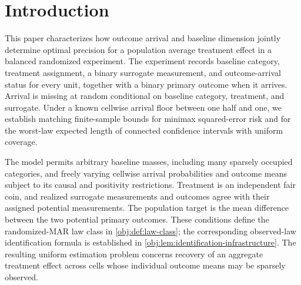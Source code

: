\begin{abstract}
We characterize optimal estimation and honest inference for the population average treatment effect in a balanced randomized experiment with incomplete primary outcomes. Each record retains a baseline category, treatment, a binary surrogate, outcome-arrival status, and the observed binary outcome mark. Outcome arrival is missing at random conditional on baseline, treatment, and surrogate, with a known cellwise arrival floor \(q\in[1/2,1]\). For sample size \(n\ge1\) and at most \(d\ge1\) baseline categories, the minimax squared-error risk is, up to universal constants,
\[
\frac1n+(1-q)^2\min\left\{1,\left[\frac{d}{n\log(e+n)}\right]^2\right\}.
\]
For each fixed noncoverage level \(\alpha\in(0,1/2)\), the minimax worst-law expected length of honest connected confidence intervals has the square-root order of this benchmark. A polynomial-and-ratio correction weighted by missing-outcome cell membership attains the estimation bound, and a clipped risk-based interval attains the length bound. Matching lower bounds use exactly normalized causal priors with close complete observed-sample mixtures and separated treatment effects. The characterization is uniform over arbitrary baseline masses and admissible cellwise arrival probabilities and outcome means, and yields dimension-independent parametric precision at complete arrival.
\end{abstract}

\section{Introduction}

This paper characterizes how outcome arrival and baseline dimension jointly determine optimal precision for a population average treatment effect in a balanced randomized experiment. The experiment records baseline category, treatment assignment, a binary surrogate measurement, and outcome-arrival status for every unit, together with a binary primary outcome when it arrives. Arrival is missing at random conditional on baseline category, treatment, and surrogate. Under a known cellwise arrival floor between one half and one, we establish matching finite-sample bounds for minimax squared-error risk and for the worst-law expected length of connected confidence intervals with uniform coverage.

The model permits arbitrary baseline masses, including many sparsely occupied categories, and freely varying cellwise arrival probabilities and outcome means subject to its causal and positivity restrictions. Treatment is an independent fair coin, and realized surrogate measurements and outcomes agree with their assigned potential measurements. The population target is the mean difference between the two potential primary outcomes. These conditions define the randomized-MAR law class in \cref{obj:def:law-class}; the corresponding observed-law identification formula is established in \cref{obj:lem:identification-infrastructure}. The resulting uniform estimation problem concerns recovery of an aggregate treatment effect across cells whose individual outcome means may be sparsely observed.

